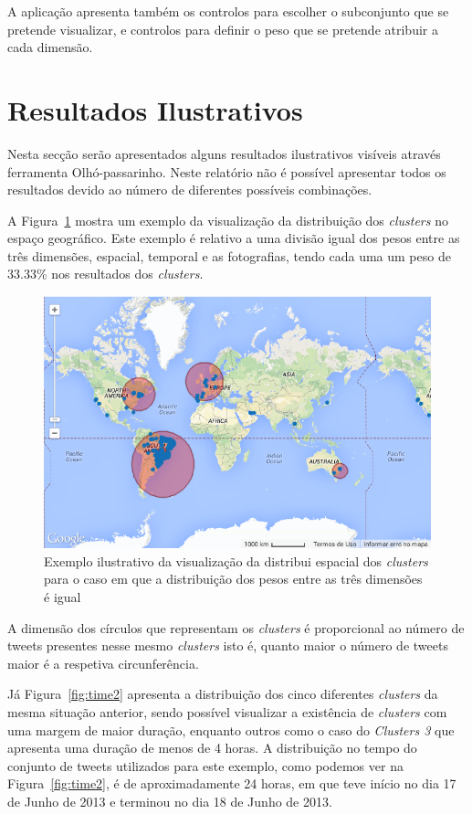 A aplicação apresenta também os controlos para escolher o subconjunto que se pretende visualizar, e controlos para definir o peso que se pretende atribuir a cada dimensão.

\section{Resultados Ilustrativos}

Nesta secção serão apresentados alguns resultados ilustrativos visíveis através ferramenta Olhó-passarinho. Neste relatório não é possível apresentar todos os resultados devido ao número de diferentes possíveis combinações. 

A Figura~\ref{fig:map3} mostra um exemplo da visualização da distribuição dos \textit{clusters} no espaço geográfico. Este exemplo é relativo a uma divisão igual dos pesos entre as três dimensões, espacial, temporal e as fotografias, tendo cada uma um peso de 33.33\% nos resultados dos \textit{clusters}.

\begin{figure}[h]
\centering
\includegraphics[width=0.6\linewidth]{./figures/olhopassarinho/map3}
\caption{Exemplo ilustrativo da visualização da distribui espacial dos \textit{clusters} para o caso em que a distribuição dos pesos entre as três dimensões é igual}
\label{fig:map3}
\end{figure}

A dimensão dos círculos que representam os \textit{clusters} é proporcional ao número de tweets presentes nesse mesmo \textit{clusters} isto é, quanto maior o número de tweets maior é a respetiva circunferência.

Já Figura~\ref{fig:time2} apresenta a distribuição dos cinco diferentes \textit{clusters} da mesma situação anterior, sendo possível visualizar a existência de \textit{clusters} com uma margem de maior duração, enquanto outros como o caso do \textit{Clusters 3} que apresenta uma duração de menos de 4 horas. A distribuição no tempo do conjunto de tweets utilizados para este exemplo, como podemos ver na Figura~\ref{fig:time2}, é de aproximadamente 24 horas, em que teve início no dia 17 de Junho de 2013 e terminou no dia 18 de Junho de 2013.

